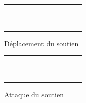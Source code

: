 \documentclass[a4paper]{scrreprt}
\begin{document}
\begin{figure}
    \centering
    \begin{tabular}{|c|c|c|c|c|c|c|c|c|c|c|}
        \hline
        &&&&&&&&&&\\ \hline  
        &&&&&&&&&&\\ \hline 
        &&&&&&&&&&\\ \hline
        &&&&\cellcolor{cblue}&&\cellcolor{cblue}&&&&\\ \hline
        &&&\cellcolor{cblue}&&&&\cellcolor{cblue}&&&\\ \hline
        &&&&&\cellcolor{yellow}&&&&&\\ \hline
        &&&\cellcolor{cblue}&&&&\cellcolor{cblue}&&&\\ \hline
        &&&&\cellcolor{cblue}&&\cellcolor{cblue}&&&&\\ \hline
        &&&&&&&&&&\\ \hline
        &&&&&&&&&&\\ \hline
        &&&&&&&&&&\\ \hline
        
    \end{tabular}
    \caption{Déplacement du soutien}
    \label{fig:soutiendep}
\end{figure}

\begin{figure}
    \centering
    \begin{tabular}{|c|c|c|c|c|c|c|c|c|c|c|}
        \hline
        &&&&&&&&&&\\ \hline  
        &&&&&&&&&&\\ \hline 
        &&&&&\cellcolor{cred}&&&&&\\ \hline
        &&&&&\cellcolor{cred}&&&&&\\ \hline
        &&&&&\cellcolor{cred}&&&&&\\ \hline
        &&\cellcolor{cred}&\cellcolor{cred}&\cellcolor{cred}&\cellcolor{yellow}&\cellcolor{cred}&\cellcolor{cred}&\cellcolor{cred}&&\\ \hline
        &&&&&\cellcolor{cred}&&&&&\\ \hline
        &&&&&\cellcolor{cred}&&&&&\\ \hline
        &&&&&\cellcolor{cred}&&&&&\\ \hline
        &&&&&&&&&&\\ \hline
        &&&&&&&&&&\\ \hline
        
    \end{tabular}
    \caption{Attaque du soutien}
    \label{fig:soutienatt}
\end{figure}
\end{document}
